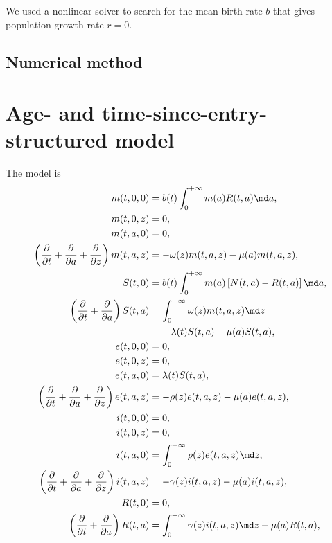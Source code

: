 \documentclass{jpmarticle}
\begin{document}
We used a nonlinear solver to search for the mean birth rate $\bar{b}$
that gives population growth rate $r = 0$.


\subsection{Numerical method}


\section{Age- and time-since-entry-structured model}

The model is
\begin{equation}
  \label{model_age_and_time_since_entry_structured}
  \begin{split}
    m(t, 0, 0) &=
    b(t) \int_0^{+\infty} m(a) R(t, a) \md a,
    \\
    m(t, 0, z) &=
    0,
    \\
    m(t, a, 0) &=
    0,
    \\
    \left(\frac{\partial}{\partial t}
      + \frac{\partial}{\partial a}
      + \frac{\partial}{\partial z}\right)
    m(t, a, z) &=
    - \omega(z) m(t, a, z) - \mu(a) m(t, a, z),
    \\
    S(t, 0) &=
    b(t) \int_0^{+\infty} m(a) \left[N(t, a) - R(t, a)\right] \md a,
    \\
    \left(\frac{\partial}{\partial t}
      + \frac{\partial}{\partial a}\right)
    S(t, a) &=
    \int_0^{+\infty} \omega(z) m(t, a, z) \md z
    \\ & \quad {}
    - \lambda(t) S(t, a) - \mu(a) S(t, a),
    \\
    e(t, 0, 0) &=
    0,
    \\
    e(t, 0, z) &=
    0,
    \\
    e(t, a, 0) &=
    \lambda(t) S(t, a),
    \\
    \left(\frac{\partial}{\partial t}
      + \frac{\partial}{\partial a}
      + \frac{\partial}{\partial z}\right)
    e(t, a, z) &=
    - \rho(z) e(t, a, z) - \mu(a) e(t, a, z),
    \\
    i(t, 0, 0) &=
    0,
    \\
    i(t, 0, z) &=
    0,
    \\
    i(t, a, 0) &=
    \int_0^{+\infty} \rho(z) e(t, a, z) \md z,
    \\
    \left(\frac{\partial}{\partial t}
      + \frac{\partial}{\partial a}
      + \frac{\partial}{\partial z}\right)
    i(t, a, z) &=
    - \gamma(z) i(t, a, z) - \mu(a) i(t, a, z),
    \\
    R(t, 0) &=
    0,
    \\
    \left(\frac{\partial}{\partial t}
      + \frac{\partial}{\partial a}\right)
    R(t, a) &=
    \int_0^{+\infty} \gamma(z) i(t, a, z) \md z
    - \mu(a) R(t, a),
  \end{split}
\end{equation}
\end{document}
